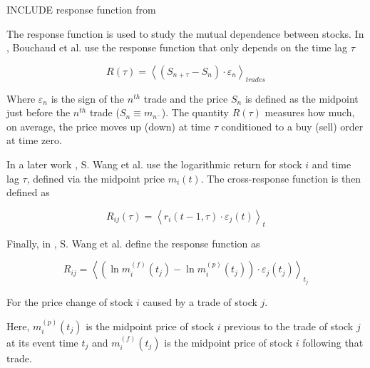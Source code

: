 INCLUDE response function from \cite{prop_order_book}

The response function is used to study the mutual dependence between stocks. In
\cite{r_walks_liquidity,Bouchaud_2004}, Bouchaud et al. use the response
function that only depends on the time lag $\tau$

\begin{equation}\label{eq:Bouchaud_2004}
    R\left(\tau\right)=\left\langle \left(S_{n+\tau}-S_{n}\right) \cdot
    \varepsilon_{n}\right\rangle_{trades}
\end{equation}

Where $\varepsilon_{n}$ is the sign of the $n^{th}$ trade and the price $S_n$
is defined as the midpoint just before the $n^{th}$ trade
($S_{n} \equiv m_{n^{-}}$).
The quantity $R\left(\tau\right)$ measures how much, on average, the price
moves up (down) at time $\tau$ conditioned to a buy (sell) order at time zero.

In a later work \cite{Wang_2016_cross}, S. Wang et al. use the logarithmic
return for stock $i$ and time lag $\tau$, defined via the midpoint price
$m_{i} \left( t \right)$. The cross-response function is then defined as

\begin{equation}\label{eq:Wang_2016}
    R_{ij}\left(\tau\right)=\left\langle r_{i}\left(t-1,\tau\right)\cdot
    \varepsilon_{j} \left(t\right) \right\rangle _{t}
\end{equation}

Finally, in \cite{Wang_2018_b}, S. Wang et al. define the response function as

\begin{equation}\label{eq:Wang_2018_b}
    R_{ij} = \left\langle \left(\ln m_{i}^{\left(f\right)}\left(t_{j}\right)-
    \ln m_{i}^{\left(p\right)} \left(t_{j}\right) \right)\cdot\varepsilon_{j}
    \left(t_{j}\right)\right\rangle _{t_{j}}
\end{equation}

For the price change of stock $i$ caused by a trade of stock $j$.

Here, $m_{i}^{\left(p\right)}\left(t_{j}\right)$ is the midpoint price of stock
$i$ previous to the trade of stock $j$ at its event time $t_j$ and
$m_{i}^{\left(f\right)}\left(t_{j}\right)$ is the midpoint price of stock $i$
following that trade.
